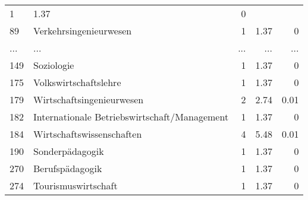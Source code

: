 \begin{longtable}{lXrrr}
          \num{1} &
          \num[round-mode=places,round-precision=2]{1.37} &
          \num[round-mode=places,round-precision=2]{0} \\
        89 & \multicolumn{1}{X}{Verkehrsingenieurwesen} & %
          \num{1} &
          \num[round-mode=places,round-precision=2]{1.37} &
          \num[round-mode=places,round-precision=2]{0} \\
       ... & ... & ... & ... & ... \\
        149 & \multicolumn{1}{X}{Soziologie} & %
          \num{1} &
          \num[round-mode=places,round-precision=2]{1.37} &
          \num[round-mode=places,round-precision=2]{0} \\

        175 & \multicolumn{1}{X}{Volkswirtschaftslehre} & %
          \num{1} &
          \num[round-mode=places,round-precision=2]{1.37} &
          \num[round-mode=places,round-precision=2]{0} \\

        179 & \multicolumn{1}{X}{Wirtschaftsingenieurwesen} & %
          \num{2} &
          \num[round-mode=places,round-precision=2]{2.74} &
          \num[round-mode=places,round-precision=2]{0.01} \\

        182 & \multicolumn{1}{X}{Internationale Betriebswirtschaft/Management} & %
          \num{1} &
          \num[round-mode=places,round-precision=2]{1.37} &
          \num[round-mode=places,round-precision=2]{0} \\

        184 & \multicolumn{1}{X}{Wirtschaftswissenschaften} & %
          \num{4} &
          \num[round-mode=places,round-precision=2]{5.48} &
          \num[round-mode=places,round-precision=2]{0.01} \\

        190 & \multicolumn{1}{X}{Sonderpädagogik} & %
          \num{1} &
          \num[round-mode=places,round-precision=2]{1.37} &
          \num[round-mode=places,round-precision=2]{0} \\

        270 & \multicolumn{1}{X}{Berufspädagogik} & %
          \num{1} &
          \num[round-mode=places,round-precision=2]{1.37} &
          \num[round-mode=places,round-precision=2]{0} \\

        274 & \multicolumn{1}{X}{Tourismuswirtschaft} & %
          \num{1} &
          \num[round-mode=places,round-precision=2]{1.37} &
          \num[round-mode=places,round-precision=2]{0} \\


\end{longtable}
